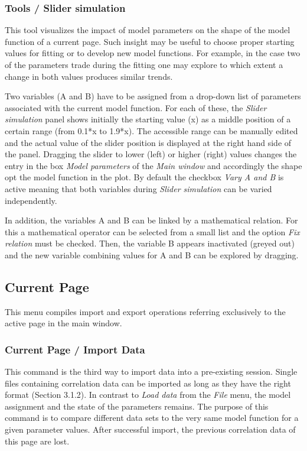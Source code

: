 \subsubsection{Tools / Slider simulation}

This tool visualizes the impact of model parameters on the shape of the model function of a current page. Such insight may be useful to choose proper starting values for fitting or to develop new model functions. For example, in the case two of the parameters trade during the fitting one may explore to which extent a change in both values produces similar trends.

Two variables (A and B) have to be assigned from a drop-down list of parameters associated with the current model function. For each of these, the \textit{Slider simulation} panel shows initially the starting value (x) as a middle position of a certain range (from 0.1*x to 1.9*x). The accessible range can be manually edited and the actual value of the slider position is displayed at the right hand side of the panel. Dragging the slider to lower (left) or higher (right) values changes the entry in the box \textit{Model parameters} of the \textit{Main window} and accordingly the shape opt the model function in the plot. By default the checkbox \textit{Vary A and B}\textit{ }is active meaning that both variables during \textit{Slider simulation} can be varied independently. 

In addition, the variables A and B can be linked by a mathematical relation. For this a mathematical operator can be selected from a small list and the option \textit{Fix relation} must be checked. Then, the variable B appears inactivated (greyed out) and the new variable combining values for A and B can be explored by dragging.

\subsection{ Current Page}

This menu compiles import and export operations referring exclusively to the active page in the main window. 

\subsubsection{Current Page / Import Data}

This command is the third way to import data into a pre-existing session. Single files containing correlation data can be imported as long as they have the right format (Section 3.1.2). In contrast to \textit{Load data} from the \textit{File} menu, the model assignment and the state of the parameters remains. The purpose of this command is to compare different data sets to the very same model function for a given parameter values. After successful import, the previous correlation data of this page are lost.

